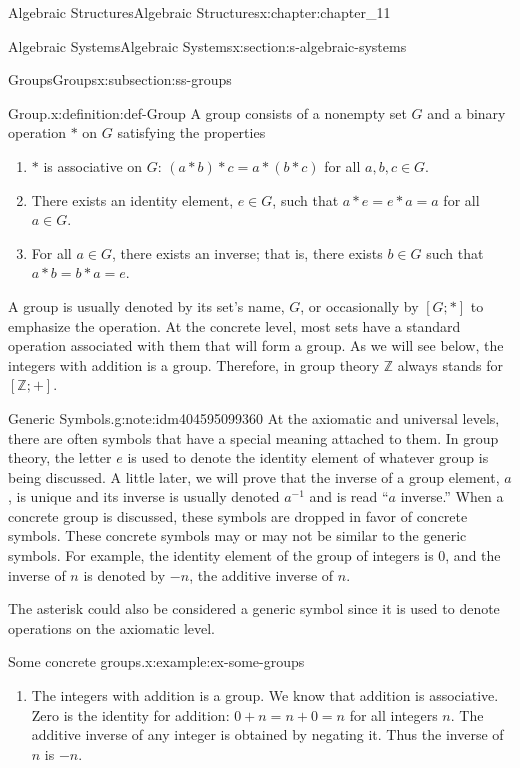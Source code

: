 \documentclass[twoside,10pt,]{book}
\numberwithin{equation}{section}
\begin{document}
\begin{chapterptx}{Algebraic Structures}{}{Algebraic Structures}{}{}{x:chapter:chapter_11}
\begin{sectionptx}{Algebraic Systems}{}{Algebraic Systems}{}{}{x:section:s-algebraic-systems}
\begin{subsectionptx}{Groups}{}{Groups}{}{}{x:subsection:ss-groups}
\begin{definition}{Group.}{x:definition:def-Group}%
%
\label{g:notation:idm404595111344}%
A group consists of a nonempty set \(G\) and a binary operation \(*\) on \(G\) satisfying the properties%
\begin{enumerate}[label=(\alph*)]
\item{}\(*\) is associative on \(G\):     \((a*b)*c=a*(b*c)\)   for all \(a, b, c \in G\).%
\item{}There exists an identity element, \(e \in G\), such that \(a*e=e*a=a\)  for all \(a \in  G\).%
\item{}For all \(a \in  G\), there exists an inverse; that is, there exists \(b\in G\) such that \(a *b = b*a=e\).%
\end{enumerate}
%
\end{definition}
A group is usually denoted by its set's name, \(G\), or occasionally by \([G; * ]\) to emphasize the operation. At the concrete level, most sets have a standard operation associated with them that will form a group. As we will see below, the integers with addition is a group. Therefore, in group theory \(\mathbb{Z}\) always stands for \([\mathbb{Z}; +]\).%
\begin{note}{Generic Symbols.}{g:note:idm404595099360}%
At the axiomatic and universal levels, there are often symbols that have a special meaning attached to them. In group theory, the letter \(e\) is used to denote the identity element of whatever group is being discussed. A little later, we will prove that the inverse of a group element, \(a\), is unique and its inverse is usually denoted \(a^{-1}\) and is read ``\(a\) inverse.'' When a concrete group is discussed, these symbols are dropped in favor of concrete symbols. These concrete symbols may or may not be similar to the generic symbols. For example, the identity element of the group of integers is 0, and the inverse of \(n\) is denoted by \(-n\), the additive inverse of \(n\).%
\par
The asterisk could also be considered a generic symbol since it is used to denote operations on the axiomatic level.%
\end{note}
\begin{example}{Some concrete groups.}{x:example:ex-some-groups}%
%
\begin{enumerate}[label=(\alph*)]
\item{}The integers with addition is a group. We know that addition is associative.  Zero is the identity for addition: \(0 + n = n + 0 = n\) for all integers \(n\). The additive inverse of any integer is obtained by negating it.  Thus the inverse of \(n\) is \(-n\).%

\end{enumerate}
\end{example}
\end{subsectionptx}
\end{sectionptx}
\end{chapterptx}
\end{document}
